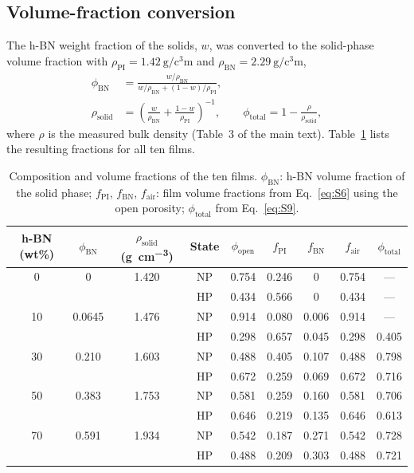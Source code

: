 \documentclass[10pt,a4paper]{article}
\newcommand{\phiBN}{\ensuremath{\phi_{\mathrm{BN}}}}
\begin{document}
\subsection{Volume-fraction conversion}
\label{si:volfrac}
The h-BN weight fraction of the solids, $w$, was converted to the solid-phase volume fraction with $\rho_{\mathrm{PI}} = \SI{1.42}{\gram\per\cubic\centi\meter}$ and $\rho_{\mathrm{BN}} = \SI{2.29}{\gram\per\cubic\centi\meter}$,
\begin{equation}
\begin{aligned}
\phiBN &= \frac{w/\rho_{\mathrm{BN}}}{w/\rho_{\mathrm{BN}} + (1-w)/\rho_{\mathrm{PI}}}, \\
\rho_{\mathrm{solid}} &= \left(\frac{w}{\rho_{\mathrm{BN}}} + \frac{1-w}{\rho_{\mathrm{PI}}}\right)^{-1}, \qquad
\phi_{\mathrm{total}} = 1 - \frac{\rho}{\rho_{\mathrm{solid}}},
\end{aligned}
\label{eq:S9}
\end{equation}
where $\rho$ is the measured bulk density (Table~3 of the main text). Table~\ref{tab:S2} lists the resulting fractions for all ten films.

\begin{table}[htbp]
\centering
\caption{Composition and volume fractions of the ten films. $\phiBN$: h-BN volume fraction of the solid phase; $f_{\mathrm{PI}}$, $f_{\mathrm{BN}}$, $f_{\mathrm{air}}$: film volume fractions from Eq.~\ref{eq:S6} using the open porosity; $\phi_{\mathrm{total}}$ from Eq.~\ref{eq:S9}.}
\label{tab:S2}
\small
\begin{tabular}{@{}ccccccccc@{}}
\toprule
h-BN (wt\%) & $\phiBN$ & $\rho_{\mathrm{solid}}$ (\si{\gram\per\cubic\centi\meter}) & State & $\phi_{\mathrm{open}}$ & $f_{\mathrm{PI}}$ & $f_{\mathrm{BN}}$ & $f_{\mathrm{air}}$ & $\phi_{\mathrm{total}}$ \\
\midrule
0  & 0      & 1.420 & NP & 0.754 & 0.246 & 0     & 0.754 & --- \\
   &        &       & HP & 0.434 & 0.566 & 0     & 0.434 & --- \\
10 & 0.0645 & 1.476 & NP & 0.914 & 0.080 & 0.006 & 0.914 & --- \\
   &        &       & HP & 0.298 & 0.657 & 0.045 & 0.298 & 0.405 \\
30 & 0.210  & 1.603 & NP & 0.488 & 0.405 & 0.107 & 0.488 & 0.798 \\
   &        &       & HP & 0.672 & 0.259 & 0.069 & 0.672 & 0.716 \\
50 & 0.383  & 1.753 & NP & 0.581 & 0.259 & 0.160 & 0.581 & 0.706 \\
   &        &       & HP & 0.646 & 0.219 & 0.135 & 0.646 & 0.613 \\
70 & 0.591  & 1.934 & NP & 0.542 & 0.187 & 0.271 & 0.542 & 0.728 \\
   &        &       & HP & 0.488 & 0.209 & 0.303 & 0.488 & 0.721 \\
\bottomrule
\end{tabular}
\end{table}
\end{document}
